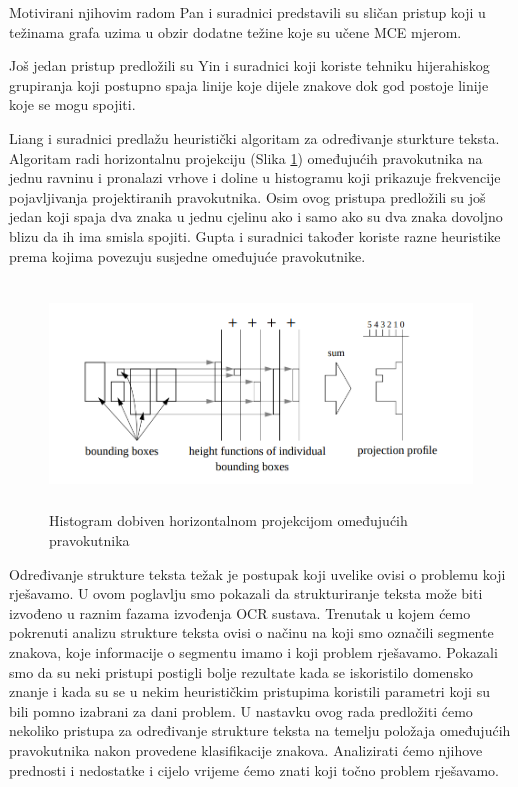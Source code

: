\documentclass[times, utf8, zavrsni]{fer}
\begin{document}
Motivirani njihovim radom Pan i suradnici \citep{pan2011hybrid} predstavili su sličan pristup
koji u težinama grafa uzima u obzir dodatne težine koje su učene MCE  mjerom.

Još jedan pristup predložili su Yin i suradnici \citep{DBLP:journals/corr/abs-1301-2628} koji koriste
tehniku hijerahiskog grupiranja koji postupno spaja linije koje dijele znakove dok god
postoje linije koje se mogu spojiti. \citep{DBLP:journals/corr/TianPHLYT16}

Liang i suradnici \citep{liang1996document} predlažu heuristički algoritam za određivanje sturkture
teksta. Algoritam radi horizontalnu projekciju (Slika \ref{fig:histogram-projection}) omeđujućih pravokutnika na jednu ravninu i pronalazi
vrhove i doline u histogramu koji prikazuje frekvencije pojavljivanja projektiranih pravokutnika.
Osim ovog pristupa predložili su još jedan koji spaja dva znaka u jednu cjelinu ako i samo ako
su dva znaka dovoljno blizu da ih ima smisla spojiti. Gupta i suradnici \citep{gupta2006document} također koriste razne heuristike prema kojima
povezuju susjedne omeđujuće pravokutnike.

\pagebreak

\begin{figure}[htb]
    \centering
    \includegraphics[height=6cm]{images/histogram-projection.png}
    \caption{Histogram dobiven horizontalnom projekcijom omeđujućih pravokutnika \citep{liang1996document}}
    \label{fig:histogram-projection}
\end{figure}

Određivanje strukture teksta težak je postupak koji uvelike ovisi o problemu koji rješavamo. U ovom
poglavlju smo pokazali da strukturiranje teksta može biti izvođeno u raznim fazama izvođenja OCR
sustava. Trenutak u kojem ćemo pokrenuti analizu strukture teksta ovisi o načinu na koji smo
označili segmente znakova, koje informacije o segmentu imamo i koji problem rješavamo.
Pokazali smo da su neki pristupi postigli bolje rezultate kada se iskoristilo domensko znanje
i kada su se u nekim heurističkim pristupima koristili parametri koji su bili pomno
izabrani za dani problem.
U nastavku ovog rada predložiti ćemo nekoliko pristupa za određivanje strukture teksta na temelju položaja omeđujućih pravokutnika nakon provedene klasifikacije
znakova. Analizirati ćemo njihove prednosti i nedostatke i cijelo vrijeme ćemo znati koji točno problem rješavamo.
\end{document}
